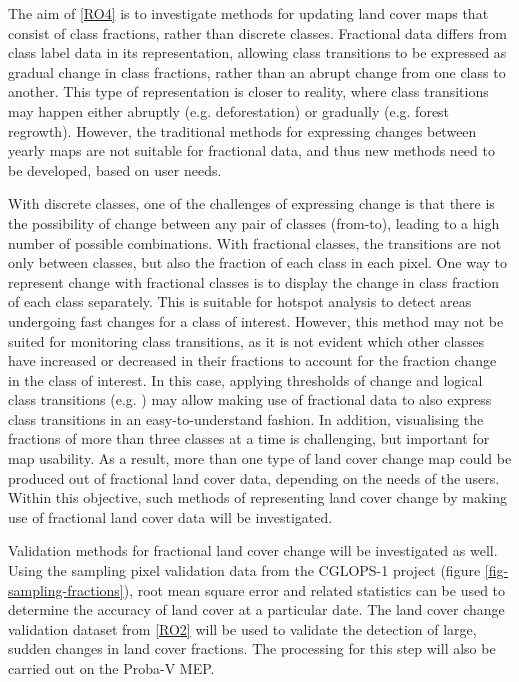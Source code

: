 \documentclass[10pt]{article}
\begin{document}
\begin{mdframed}[style=table,frametitle=\textbf{7. DETAILED DESCRIPTION OF THE RESEARCH PLAN} (max. 2500 words + 1 page literature list)]
The aim of \ref{RO4} is to investigate methods for updating land cover maps that consist of class fractions, rather than discrete classes. Fractional data differs from class label data in its representation, allowing class transitions to be expressed as gradual change in class fractions, rather than an abrupt change from one class to another. This type of representation is closer to reality, where class transitions may happen either abruptly (e.g. deforestation) or gradually (e.g. forest regrowth). However, the traditional methods for expressing changes between yearly maps are not suitable for fractional data, and thus new methods need to be developed, based on user needs.

With discrete classes, one of the challenges of expressing change is that there is the possibility of change between any pair of classes (from-to), leading to a high number of possible combinations. With fractional classes, the transitions are not only between classes, but also the fraction of each class in each pixel. One way to represent change with fractional classes is to display the change in class fraction of each class separately. This is suitable for hotspot analysis to detect areas undergoing fast changes for a class of interest. However, this method may not be suited for monitoring class transitions, as it is not evident which other classes have increased or decreased in their fractions to account for the fraction change in the class of interest. In this case, applying thresholds of change and logical class transitions (e.g. \citet{cai_enhancing_2014}) may allow making use of fractional data to also express class transitions in an easy-to-understand fashion. In addition, visualising the fractions of more than three classes at a time \citep{hengl_double_2004} is challenging, but important for map usability. As a result, more than one type of land cover change map could be produced out of fractional land cover data, depending on the needs of the users. Within this objective, such methods of representing land cover change by making use of fractional land cover data will be investigated.

Validation methods for fractional land cover change will be investigated as well. Using the sampling pixel validation data from the CGLOPS-1 project (figure \ref{fig-sampling-fractions}), root mean square error and related statistics can be used to determine the accuracy of land cover at a particular date. The land cover change validation dataset from \ref{RO2} will be used to validate the detection of large, sudden changes in land cover fractions. The processing for this step will also be carried out on the Proba-V MEP.


\end{mdframed}
\end{document}
